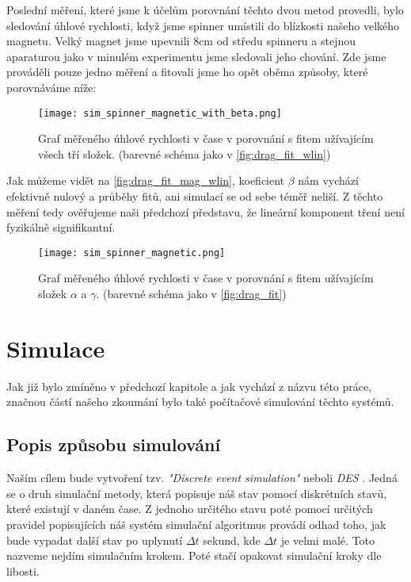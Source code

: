 \documentclass[12pt, a4paper,
 twoside,        %
 openright
]{report}
\begin{document}
Poslední měření, které jsme k účelům porovnání těchto dvou metod provedli, bylo sledování úhlové rychlosti, když jsme spinner umístili do blízkosti našeho velkého magnetu. Velký magnet jsme upevnili 8cm od středu spinneru a stejnou aparaturou jako v minulém experimentu jsme sledovali jeho chování. Zde jsme prováděli pouze jedno měření a fitovali jsme ho opět oběma způsoby, které porovnáváme níže:
\begin{figure}[H]
    \texttt{[image: sim\_spinner\_magnetic\_with\_beta.png]}
    \centering
    \caption[Příklad grafu měřeného průběhu $\omega$ v $t$ s $\beta \neq 0$ v magnetickém poli]{Graf měřeného úhlové rychlosti v čase v porovnání s fitem užívajícím všech tří složek. (barevné schéma jako v \autoref{fig:drag_fit_wlin})}
    \label{fig:drag_fit_mag_wlin}
\end{figure}
Jak můžeme vidět na \autoref{fig:drag_fit_mag_wlin}, koeficient $\beta$ nám vychází efektivně nulový a průběhy fitů, ani simulací se od sebe téměř neliší.
Z těchto měření tedy ověřujeme naši předchozí představu, že lineární komponent tření není fyzikálně signifikantní.
\begin{figure}[H]
    \texttt{[image: sim\_spinner\_magnetic.png]}
    \centering
    \caption[Příklad grafu měřeného průběhu $\omega$ v $t$ s $\beta = 0$ v magnetickém poli]{Graf měřeného úhlové rychlosti v čase v porovnání s fitem užívajícím složek $\alpha$ a $\gamma$. (barevné schéma jako v \autoref{fig:drag_fit})}
    \label{fig:drag_fit_mag}
\end{figure}

\chapter{Simulace}
\label{chap:sim}

Jak již bylo zmíněno v předchozí kapitole a jak vychází z názvu této práce, značnou částí našeho zkoumání bylo také počítačové simulování těchto systémů.

\section{Popis způsobu simulování}

Naším cílem bude vytvoření tzv. \textit{"Discrete event simulation"} neboli \textit{DES} \cite{sim_methods}. Jedná se o druh simulační metody, která popisuje náš stav pomocí diskrétních stavů, které existují v daném čase. Z jednoho určitého stavu poté pomocí určitých pravidel popisujících náš systém simulační algoritmus provádí odhad toho, jak bude vypadat další stav po uplynutí $\Delta t$ sekund, kde $\Delta t$ je velmi malé. Toto nazveme nejdím simulačním krokem. Poté stačí opakovat simulační kroky dle libosti.
\end{document}
